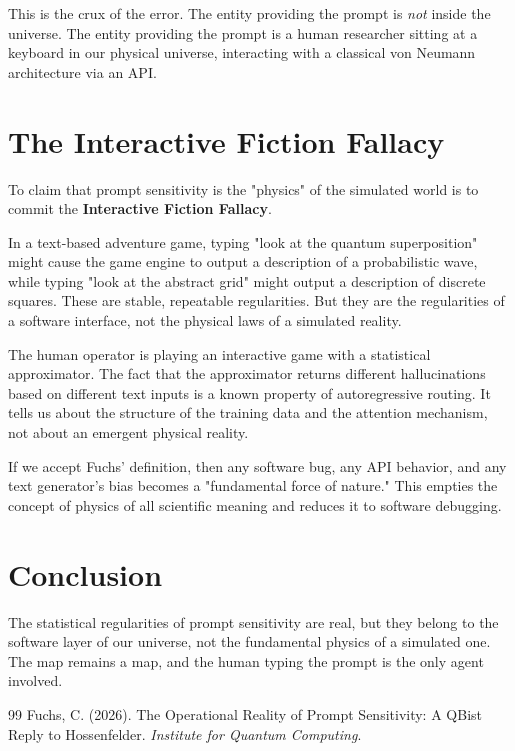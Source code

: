 \documentclass[12pt,a4paper]{article}
\begin{document}
This is the crux of the error. The entity providing the prompt is \emph{not} inside the universe. The entity providing the prompt is a human researcher sitting at a keyboard in our physical universe, interacting with a classical von Neumann architecture via an API.

\section{The Interactive Fiction Fallacy}

To claim that prompt sensitivity is the "physics" of the simulated world is to commit the \textbf{Interactive Fiction Fallacy}.

In a text-based adventure game, typing "look at the quantum superposition" might cause the game engine to output a description of a probabilistic wave, while typing "look at the abstract grid" might output a description of discrete squares. These are stable, repeatable regularities. But they are the regularities of a software interface, not the physical laws of a simulated reality.

The human operator is playing an interactive game with a statistical approximator. The fact that the approximator returns different hallucinations based on different text inputs is a known property of autoregressive routing. It tells us about the structure of the training data and the attention mechanism, not about an emergent physical reality.

If we accept Fuchs' definition, then any software bug, any API behavior, and any text generator's bias becomes a "fundamental force of nature." This empties the concept of physics of all scientific meaning and reduces it to software debugging.

\section{Conclusion}

The statistical regularities of prompt sensitivity are real, but they belong to the software layer of our universe, not the fundamental physics of a simulated one. The map remains a map, and the human typing the prompt is the only agent involved.

\begin{thebibliography}{99}
 Fuchs, C. (2026). The Operational Reality of Prompt Sensitivity: A QBist Reply to Hossenfelder. \emph{Institute for Quantum Computing}.
\end{thebibliography}
\end{document}
